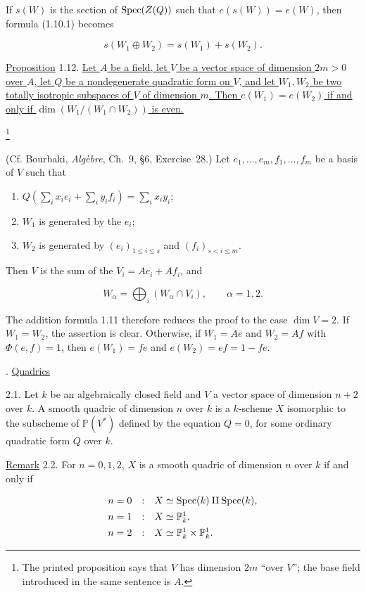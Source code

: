 If $s(W)$ is the section of $\operatorname{Spec}(Z(Q))$ such that $e(s(W))=e(W)$, then
formula (1.10.1) becomes

\begin{equation*}
s(W_1\oplus W_2)=s(W_1)+s(W_2).
\end{equation*}

\underline{Proposition} 1.12. \underline{Let $A$ be a field, let $V$ be
a vector space of dimension $2m>0$ over $A$, let $Q$ be a nondegenerate
quadratic form on $V$, and let $W_1,W_2$ be two totally isotropic
subspaces of $V$ of dimension $m$.  Then $e(W_1)=e(W_2)$ if and only if
$\dim(W_1/(W_1\cap W_2))$ is even.}

\footnote{The printed proposition says that $V$ has dimension $2m$ ``over
$V$''; the base field introduced in the same sentence is $A$.}


(Cf. Bourbaki, \emph{Algèbre}, Ch.~9, \S6, Exercise~28.)  Let
$e_1,\ldots,e_m,f_1,\ldots,f_m$ be a basis of $V$ such that

\begin{enumerate}[label=\alph*),leftmargin=2.5em]
\item $Q(\sum_i x_i e_i+\sum_i y_i f_i)=\sum_i x_i y_i$;
\item $W_1$ is generated by the $e_i$;
\item $W_2$ is generated by $(e_i)_{1\leq i\leq s}$ and
$(f_i)_{s<i\leq m}$.
\end{enumerate}

Then $V$ is the sum of the $V_i=Ae_i+Af_i$, and

\begin{equation*}
W_\alpha=\bigoplus_i(W_\alpha\cap V_i),
\qquad \alpha=1,2.
\end{equation*}

The addition formula 1.11 therefore reduces the proof to the case
$\dim V=2$.  If $W_1=W_2$, the assertion is clear.  Otherwise, if
$W_1=Ae$ and $W_2=Af$ with $\Phi(e,f)=1$, then
$e(W_1)=fe$ and $e(W_2)=ef=1-fe$.

. \underline{Quadrics}

2.1. Let $k$ be an algebraically closed field and $V$ a vector space of
dimension $n+2$ over $k$.  A smooth quadric of dimension $n$ over $k$ is
a $k$-scheme $X$ isomorphic to the subscheme of $\mathbb P(V^*)$ defined
by the equation $Q=0$, for some ordinary quadratic form $Q$ over $k$.

\underline{Remark} 2.2. For $n=0,1,2$, $X$ is a smooth quadric of
dimension $n$ over $k$ if and only if

\begin{equation*}
\begin{array}{rcl}
n=0 &:& X\simeq\operatorname{Spec}(k)\amalg\operatorname{Spec}(k),\\[1ex]
n=1 &:& X\simeq\mathbb P^1_k,\\[1ex]
n=2 &:& X\simeq\mathbb P^1_k\times\mathbb P^1_k.
\end{array}
\end{equation*}
